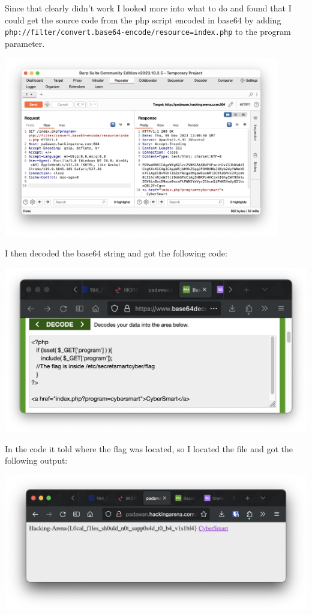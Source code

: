 Since that clearly didn't work I looked more into what to do and found that I could get the source code from the php script encoded in base64 by adding\\ \texttt{php://filter/convert.base64-encode/resource=index.php} to the program parameter.

\begin{center}
    \includegraphics[width=12cm]{img/Web hacking/Cybersmart/Screenshot 2023-11-09 at 14.04.28.png}
\end{center}

I then decoded the base64 string and got the following code:

\begin{center}
    \includegraphics[width=15cm]{img/Web hacking/Cybersmart/Screenshot 2023-11-09 at 14.05.04.png}
\end{center}

In the code it told where the flag was located, so I located the file and got the following output:

\begin{center}
    \includegraphics[width=15cm]{img/Web hacking/Cybersmart/Screenshot 2023-11-09 at 14.02.40.png}
\end{center}

